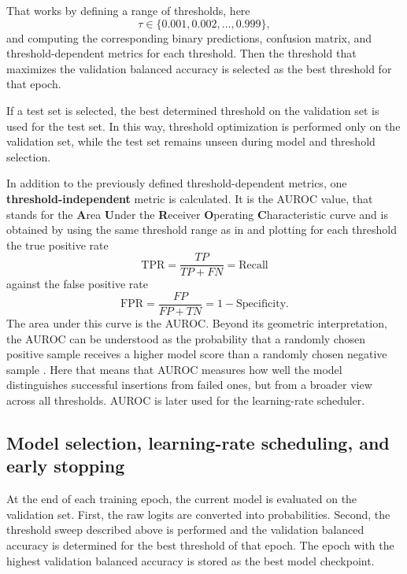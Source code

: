 That works by defining a range of thresholds, here
\begin{equation}
\tau \in \{0.001, 0.002, \dots, 0.999\},
\label{eq:threshold}
\end{equation}
and computing the corresponding binary predictions, confusion matrix, and threshold-dependent metrics for each threshold. Then the threshold that maximizes the validation balanced accuracy is selected as the best threshold for that epoch.

If a test set is selected, the best determined threshold on the validation set is used for the test set. In this way, threshold optimization is performed only on the validation set, while the test set remains unseen during model and threshold selection.

In addition to the previously defined threshold-dependent metrics, one \textbf{threshold-independent} metric is calculated. It is the AUROC value, that stands for the \textbf{A}rea \textbf{U}nder the \textbf{R}eceiver \textbf{O}perating \textbf{C}haracteristic curve and is obtained by using the same threshold range as in  and plotting for each threshold the true positive rate
\begin{equation}
\mathrm{TPR} = \frac{TP}{TP+FN} = \text{Recall}
\end{equation}
against the false positive rate
\begin{equation}
\mathrm{FPR} = \frac{FP}{FP+TN} = 1 - \text{Specificity}.
\end{equation}
The area under this curve is the AUROC. Beyond its geometric interpretation, the AUROC can be understood as the probability that a randomly chosen positive sample receives a higher model score than a randomly chosen negative sample \cite{hanleyMeaningUseArea1982}. Here that means that AUROC measures how well the model distinguishes successful insertions from failed ones, but from a broader view across all thresholds. AUROC is later used for the learning-rate scheduler.

\subsection{Model selection, learning-rate scheduling, and early stopping}

At the end of each training epoch, the current model is evaluated on the validation set. First, the raw logits are converted into probabilities. Second, the threshold sweep described above is performed and the validation balanced accuracy is determined for the best threshold of that epoch. The epoch with the highest validation balanced accuracy is stored as the best model checkpoint.


